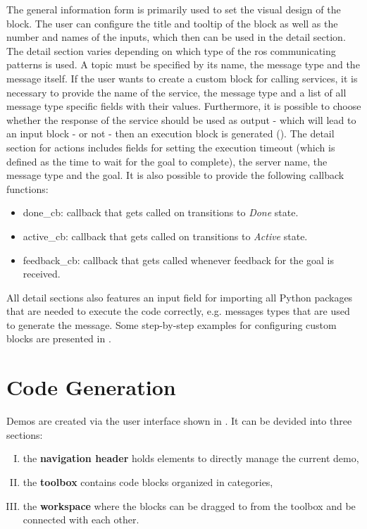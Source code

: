 The general information form is primarily used to set the visual design of the block. The user can configure the title and tooltip of the block as well as the number and names of the inputs, which then can be used in the detail section. The detail section varies depending on which type of the \gls{ros} communicating patterns is used. A topic must be specified by its name, the message type and the message itself. If the user wants to create a custom block for calling services, it is necessary to provide the name of the service, the message type and a list of all message type specific fields with their values. Furthermore, it is possible to choose whether the response of the service should be used as output - which will lead to an input block - or not - then an execution block is generated (). The detail section for actions includes fields for setting the execution timeout (which is defined as the time to wait for the goal to complete), the server name, the message type and the goal. It is also possible to provide the following callback functions:

\begin{itemize}
	\item done\_cb: callback that gets called on transitions to  \textit{Done} state.
	\item active\_cb: callback that gets called on transitions to  \textit{Active} state.
	\item feedback\_cb: callback that gets called whenever feedback for the goal is received.
\end{itemize}

All detail sections also features an input field for importing all Python packages that are needed to execute the code correctly, e.g. messages types that are used to generate the message. Some step-by-step examples for configuring custom blocks are presented in .

\section{Code Generation} \label{sec:CodeGeneration}
Demos are created via the user interface shown in . It can be devided into three sections:

\begin{enumerate}[I.]
	\item the \textbf{navigation header} holds elements to directly manage the current demo,
	\item the \textbf{toolbox} contains code blocks organized in categories,
	\item the \textbf{workspace} where the blocks can be dragged to from the toolbox and be connected with each other.
\end{enumerate}

